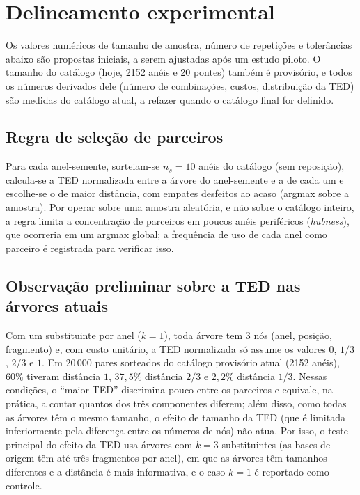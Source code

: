 
\section{Delineamento experimental}
\label{sec:delineamento}

Os valores numéricos de tamanho de amostra, número de repetições e tolerâncias abaixo são propostas iniciais, a serem ajustadas após um estudo piloto. O tamanho do catálogo (hoje, 2152 anéis e 20 pontes) também é provisório, e todos os números derivados dele (número de combinações, custos, distribuição da TED) são medidas do catálogo atual, a refazer quando o catálogo final for definido.

\subsection{Regra de seleção de parceiros}

Para cada anel-semente, sorteiam-se $n_s=10$ anéis do catálogo (sem reposição), calcula-se a TED normalizada entre a árvore do anel-semente e a de cada um e escolhe-se o de maior distância, com empates desfeitos ao acaso (argmax sobre a amostra). Por operar sobre uma amostra aleatória, e não sobre o catálogo inteiro, a regra limita a concentração de parceiros em poucos anéis periféricos (\textit{hubness}), que ocorreria em um argmax global; a frequência de uso de cada anel como parceiro é registrada para verificar isso.

\subsection{Observação preliminar sobre a TED nas árvores atuais}

Com um substituinte por anel ($k=1$), toda árvore tem 3 nós (anel, posição, fragmento) e, com custo unitário, a TED normalizada só assume os valores $0$, $1/3$, $2/3$ e $1$. Em $20\,000$ pares sorteados do catálogo provisório atual (2152 anéis), $60\%$ tiveram distância $1$, $37{,}5\%$ distância $2/3$ e $2{,}2\%$ distância $1/3$. Nessas condições, o ``maior TED'' discrimina pouco entre os parceiros e equivale, na prática, a contar quantos dos três componentes diferem; além disso, como todas as árvores têm o mesmo tamanho, o efeito de tamanho da TED (que é limitada inferiormente pela diferença entre os números de nós) não atua. Por isso, o teste principal do efeito da TED usa árvores com $k=3$ substituintes (as bases de origem têm até três fragmentos por anel), em que as árvores têm tamanhos diferentes e a distância é mais informativa, e o caso $k=1$ é reportado como controle.


